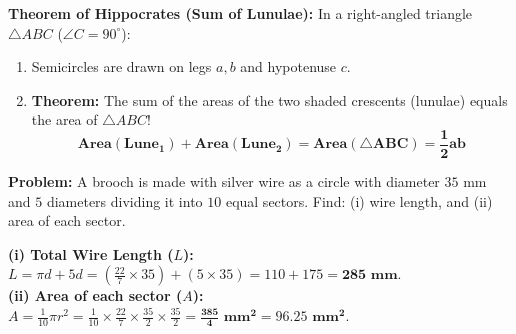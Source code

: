 \documentclass[10pt,a4paper]{article}
\begin{document}
\begin{minipage}[c]{0.42\textwidth}
\centering
{}
\end{minipage}\hfill
\begin{minipage}[c]{0.56\textwidth}
\begin{formulaBox}
  \textbf{Theorem of Hippocrates (Sum of Lunulae):}
  In a right-angled triangle $\triangle ABC$ ($\angle C = 90^\circ$):
  \begin{enumerate}
    \item Semicircles are drawn on legs $a, b$ and hypotenuse $c$.
    \item \textbf{Theorem:} The sum of the areas of the two shaded crescents (lunulae) equals the area of $\triangle ABC$!
      $$\mathbf{\text{Area}(\text{Lune}_1) + \text{Area}(\text{Lune}_2) = \text{Area}(\triangle ABC) = \frac{1}{2}ab}$$
  \end{enumerate}
\end{formulaBox}
\end{minipage}

\vspace{0.8mm}
\begin{conceptBox}[title={Worked Archetype 9 $\vert$ Brooch Silver Wire \& Sector Calculation},fonttitle=\bfseries\color{navy}]
  \textbf{Problem:} A brooch is made with silver wire as a circle with diameter $35\text{ mm}$ and $5$ diameters dividing it into $10$ equal sectors. Find: (i) wire length, and (ii) area of each sector.
  \par\vspace{0.6mm}\noindent
  \textbf{(i) Total Wire Length ($L$):} $L = \pi d + 5d = \left(\frac{22}{7} \times 35\right) + (5 \times 35) = 110 + 175 = \mathbf{285\text{ mm}}$.\\
  \textbf{(ii) Area of each sector ($A$):} $A = \frac{1}{10}\pi r^2 = \frac{1}{10} \times \frac{22}{7} \times \frac{35}{2} \times \frac{35}{2} = \mathbf{\frac{385}{4}\text{ mm}^2 = 96.25\text{ mm}^2}$.
\end{conceptBox}
\end{document}
